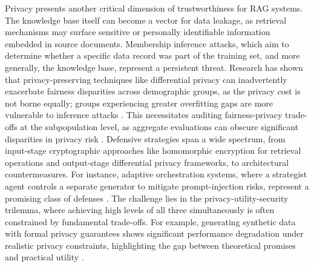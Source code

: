 \documentclass[11pt]{article}
\begin{document}
Privacy presents another critical dimension of trustworthiness for RAG systems. The knowledge base itself can become a vector for data leakage, as retrieval mechanisms may surface sensitive or personally identifiable information embedded in source documents. Membership inference attacks, which aim to determine whether a specific data record was part of the training set, and more generally, the knowledge base, represent a persistent threat. Research has shown that privacy-preserving techniques like differential privacy can inadvertently exacerbate fairness disparities across demographic groups, as the privacy cost is not borne equally; groups experiencing greater overfitting gaps are more vulnerable to inference attacks \cite{ref616}. This necessitates auditing fairness-privacy trade-offs at the subpopulation level, as aggregate evaluations can obscure significant disparities in privacy risk \cite{ref617}. Defensive strategies span a wide spectrum, from input-stage cryptographic approaches like homomorphic encryption for retrieval operations and output-stage differential privacy frameworks, to architectural countermeasures. For instance, adaptive orchestration systems, where a strategist agent controls a separate generator to mitigate prompt-injection risks, represent a promising class of defenses \cite{ref618}. The challenge lies in the privacy-utility-security trilemma, where achieving high levels of all three simultaneously is often constrained by fundamental trade-offs. For example, generating synthetic data with formal privacy guarantees shows significant performance degradation under realistic privacy constraints, highlighting the gap between theoretical promises and practical utility \cite{ref619}.
\end{document}
